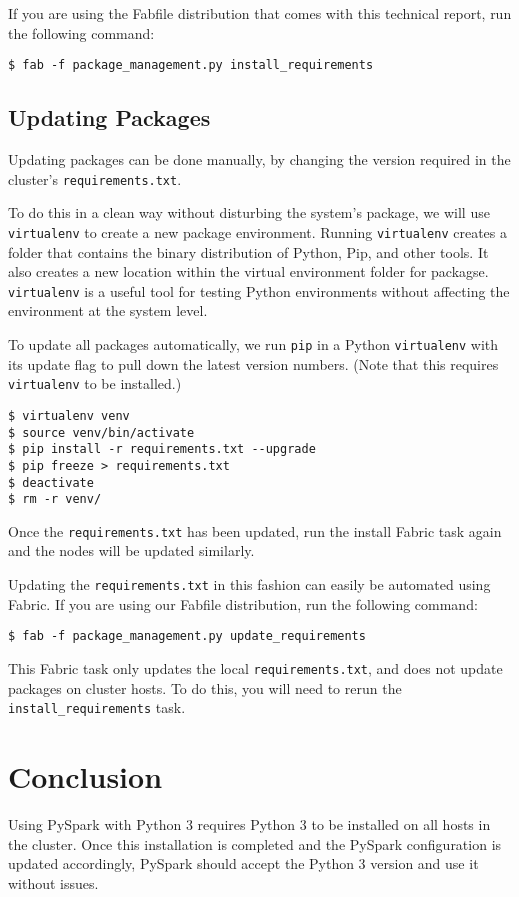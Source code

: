 \documentclass[9pt,twocolumn,twoside]{idsi}
\begin{document}
If you are using the Fabfile distribution that comes with this technical report, run the following command:

\begin{verbatim}
$ fab -f package_management.py install_requirements
\end{verbatim}

\subsection{Updating Packages}
Updating packages can be done manually, by changing the version required in the cluster's \texttt{requirements.txt}.

To do this in a clean way without disturbing the system's package, we will use \texttt{virtualenv} to create a new package environment. Running \texttt{virtualenv} creates a folder that contains the binary distribution of Python, Pip, and other tools. It also creates a new location within the virtual environment folder for packagse. \texttt{virtualenv} is a useful tool for testing Python environments without affecting the environment at the system level.

To update all packages automatically, we run \texttt{pip} in a Python \texttt{virtualenv} with its update flag to pull down the latest version numbers. (Note that this requires \texttt{virtualenv} to be installed.)

\begin{verbatim}
$ virtualenv venv
$ source venv/bin/activate
$ pip install -r requirements.txt --upgrade
$ pip freeze > requirements.txt
$ deactivate
$ rm -r venv/
\end{verbatim}

Once the \texttt{requirements.txt} has been updated, run the install Fabric task again and the nodes will be updated similarly.

Updating the \texttt{requirements.txt} in this fashion can easily be automated using Fabric. If you are using our Fabfile distribution, run the following command:
\begin{verbatim}
$ fab -f package_management.py update_requirements
\end{verbatim}

This Fabric task only updates the local \texttt{requirements.txt}, and does not update packages on cluster hosts. To do this, you will need to rerun the \texttt{install\_requirements} task.

\section{Conclusion}
Using PySpark with Python 3 requires Python 3 to be installed on all hosts in the cluster. Once this installation is completed and the PySpark configuration is updated accordingly, PySpark should accept the Python 3 version and use it without issues.
\end{document}
